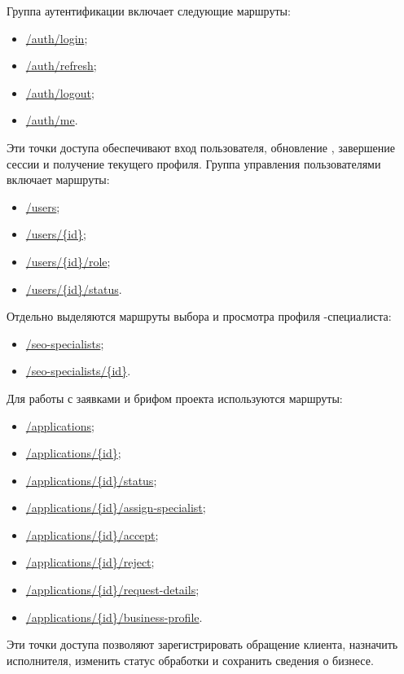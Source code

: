 Группа аутентификации включает следующие маршруты:
\begin{itemize}[leftmargin=1.25cm]
    \item \url{/auth/login};
    \item \url{/auth/refresh};
    \item \url{/auth/logout};
    \item \url{/auth/me}.
\end{itemize}

Эти точки доступа обеспечивают вход пользователя, обновление , завершение сессии и получение текущего профиля. Группа управления пользователями включает маршруты:
\begin{itemize}[leftmargin=1.25cm]
    \item \url{/users};
    \item \url{/users/\{id\}};
    \item \url{/users/\{id\}/role};
    \item \url{/users/\{id\}/status}.
\end{itemize}

Отдельно выделяются маршруты выбора и просмотра профиля -специалиста:
\begin{itemize}[leftmargin=1.25cm]
    \item \url{/seo-specialists};
    \item \url{/seo-specialists/\{id\}}.
\end{itemize}

Для работы с заявками и брифом проекта используются маршруты:
\begin{itemize}[leftmargin=1.25cm]
    \item \url{/applications};
    \item \url{/applications/\{id\}};
    \item \url{/applications/\{id\}/status};
    \item \url{/applications/\{id\}/assign-specialist};
    \item \url{/applications/\{id\}/accept};
    \item \url{/applications/\{id\}/reject};
    \item \url{/applications/\{id\}/request-details};
    \item \url{/applications/\{id\}/business-profile}.
\end{itemize}

Эти точки доступа позволяют зарегистрировать обращение клиента, назначить исполнителя, изменить статус обработки и сохранить сведения о бизнесе.

